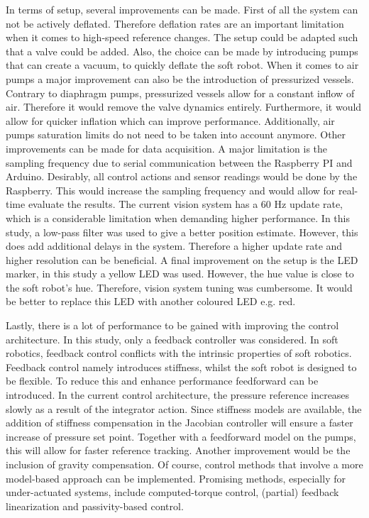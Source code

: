 In terms of setup, several improvements can be made. First of all the system can not be actively deflated. Therefore deflation rates are an important limitation when it comes to high-speed reference changes. The setup could be adapted such that a valve could be added. Also, the choice can be made by introducing pumps that can create a vacuum, to quickly deflate the soft robot. When it comes to air pumps a major improvement can also be the introduction of pressurized vessels. Contrary to diaphragm pumps, pressurized vessels allow for a constant inflow of air. Therefore it would remove the valve dynamics entirely. Furthermore, it would allow for quicker inflation which can improve performance. Additionally, air pumps saturation limits do not need to be taken into account anymore. Other improvements can be made for data acquisition. A major limitation is the sampling frequency due to serial communication between the Raspberry PI and Arduino. Desirably, all control actions and sensor readings would be done by the Raspberry. This would increase the sampling frequency and would allow for real-time evaluate the results. The current vision system has a 60 Hz update rate, which is a considerable limitation when
demanding higher performance. In this study, a low-pass filter was used to give a better position estimate. However, this does add additional delays in the system. Therefore a higher update rate and higher resolution can be beneficial. A final improvement on the setup is the LED marker, in this study a yellow LED was used. However, the hue value is close to the soft robot's hue. Therefore, vision system tuning was cumbersome. It would be better to replace this LED with another coloured LED e.g. red. 


Lastly, there is a lot of performance to be gained with improving the control architecture. In this study, only a feedback controller was considered. In soft robotics, feedback control conflicts with the intrinsic properties of soft robotics. Feedback control namely introduces stiffness, whilst the soft robot is designed to be flexible. To reduce this and enhance performance feedforward can be introduced. In the current control architecture, the pressure reference increases slowly as a result of the integrator action. Since stiffness models are available, the addition of stiffness compensation in the Jacobian controller will ensure a faster increase of pressure set point. Together with a feedforward model on the pumps, this will allow for faster reference tracking. Another improvement would be the inclusion of gravity compensation. Of course, control methods that involve a more model-based approach can be implemented. Promising methods, especially for under-actuated systems, include computed-torque control, (partial) feedback linearization and passivity-based control.  
